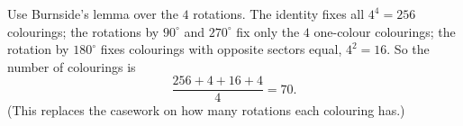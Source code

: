 Use Burnside's lemma over the $4$ rotations. The identity fixes all $4^4=256$ colourings; the rotations by $90^\circ$ and $270^\circ$ fix only the $4$ one-colour colourings; the rotation by $180^\circ$ fixes colourings with opposite sectors equal, $4^2=16$. So the number of colourings is
\[
\dfrac{256+4+16+4}{4}=\boxed{70}.
\]
(This replaces the casework on how many rotations each colouring has.)
